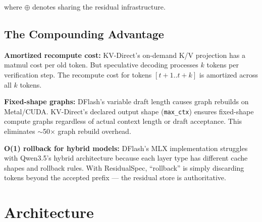 \documentclass[11pt]{article}
\begin{document}
where $\oplus$ denotes sharing the residual infrastructure.

\subsection{The Compounding Advantage}

\textbf{Amortized recompute cost:} KV-Direct's on-demand K/V projection has a matmul cost per old token. But speculative decoding processes $k$ tokens per verification step. The recompute cost for tokens $[t+1..t+k]$ is amortized across all $k$ tokens.

\textbf{Fixed-shape graphs:} DFlash's variable draft length causes graph rebuilds on Metal/CUDA. KV-Direct's declared output shape (\texttt{max\_ctx}) ensures fixed-shape compute graphs regardless of actual context length or draft acceptance. This eliminates $\sim$50$\times$ graph rebuild overhead.

\textbf{O(1) rollback for hybrid models:} DFlash's MLX implementation struggles with Qwen3.5's hybrid architecture because each layer type has different cache shapes and rollback rules. With ResidualSpec, ``rollback'' is simply discarding tokens beyond the accepted prefix — the residual store is authoritative.

\section{Architecture}
\end{document}
